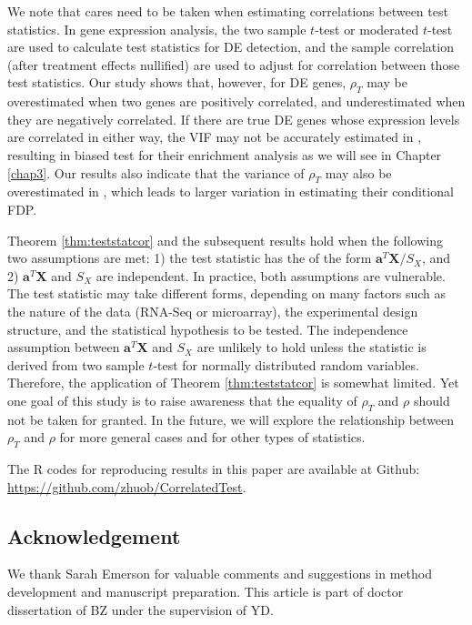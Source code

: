 	We note that cares need to be taken when estimating correlations between test statistics.
	In gene expression analysis, the two sample $t$-test \citep{barry2008statistical, 
		efron2007correlation,qiu2005correlation} or moderated 
	$t$-test \citep{wu2012camera} are used to calculate test statistics for DE detection, and the 
	sample correlation (after treatment effects 
	nullified) are used to adjust for correlation between those test statistics.
	Our study shows that, however, for DE genes, $\rho_T$ may be overestimated when
	two genes are positively correlated, and underestimated when they are negatively correlated. If 
	there are true DE genes whose expression 
	levels are correlated in either way, the VIF may not be accurately estimated in 
	\cite{wu2012camera}, resulting in biased test
	for their enrichment analysis as we will see in Chapter \ref{chap3}. Our results also indicate 
	that the variance of 
	$\rho_T$ may also be overestimated in
	\cite{efron2007correlation}, which leads to larger variation in estimating their conditional 
	FDP.
	
	Theorem \ref{thm:teststatcor} and the subsequent results hold when the following two 
	assumptions are met: 1) the test statistic has the of 
	the form $\bm a^T\bm X/S_X$, and 2) $\bm a^T\bm X$ and $S_X$ are independent. In practice, both 
	assumptions are vulnerable.
	The test statistic may take different forms, depending on many factors such as the nature of 
	the data (RNA-Seq or microarray), the 
	experimental design structure, and the statistical hypothesis to be tested. The independence 
	assumption between $\bm a^T\bm X$ and $S_X$ are 
	unlikely to hold unless the statistic is derived from two sample $t$-test for normally 
	distributed random variables. Therefore, the 
	application of Theorem \ref{thm:teststatcor} is somewhat limited. Yet one goal of this study is 
	to raise awareness that the equality of $\rho_T$ 
	and $\rho$ should not be taken for granted. In the future, we will explore the relationship 
	between $\rho_T$ and $\rho$ for more general cases and for other types of statistics. 
	
	The R codes for reproducing results in this paper are available at Github: 
	\url{https://github.com/zhuob/CorrelatedTest}.


	\subsection*{Acknowledgement}			
	We thank Sarah Emerson for valuable comments and suggestions in method development and 
	manuscript preparation. This article is part of doctor dissertation of BZ under the supervision 
	of YD.
	




	\newpage

